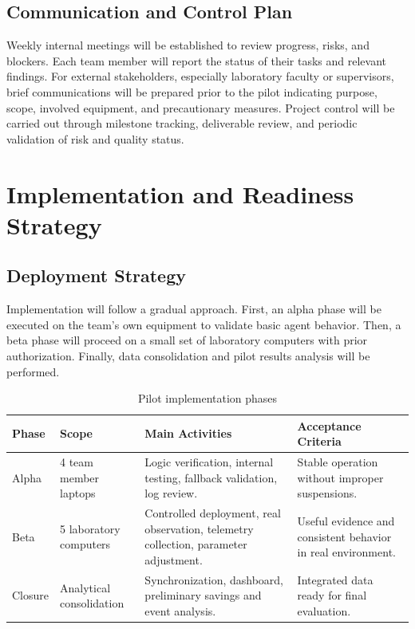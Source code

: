 \documentclass[12pt,a4paper]{article}
\begin{document}
\subsection{Communication and Control Plan}
Weekly internal meetings will be established to review progress, risks, and blockers. Each team member will report the status of their tasks and relevant findings. For external stakeholders, especially laboratory faculty or supervisors, brief communications will be prepared prior to the pilot indicating purpose, scope, involved equipment, and precautionary measures. Project control will be carried out through milestone tracking, deliverable review, and periodic validation of risk and quality status.

\section{Implementation and Readiness Strategy}

\subsection{Deployment Strategy}
Implementation will follow a gradual approach. First, an alpha phase will be executed on the team's own equipment to validate basic agent behavior. Then, a beta phase will proceed on a small set of laboratory computers with prior authorization. Finally, data consolidation and pilot results analysis will be performed.

\begin{table}[H]
\caption{Pilot implementation phases}
\label{tab:implementation}
\centering
\begin{tabular}{|p{2cm}|p{2cm}|p{6cm}|p{4.3cm}|}
\hline
\textbf{Phase} & \textbf{Scope} & \textbf{Main Activities} & \textbf{Acceptance Criteria} \\
\hline
Alpha & 4 team member laptops & Logic verification, internal testing, fallback validation, log review. & Stable operation without improper suspensions. \\
\hline
Beta & 5 laboratory computers & Controlled deployment, real observation, telemetry collection, parameter adjustment. & Useful evidence and consistent behavior in real environment. \\
\hline
Closure & Analytical consolidation & Synchronization, dashboard, preliminary savings and event analysis. & Integrated data ready for final evaluation. \\
\hline
\end{tabular}
\end{table}
\end{document}
